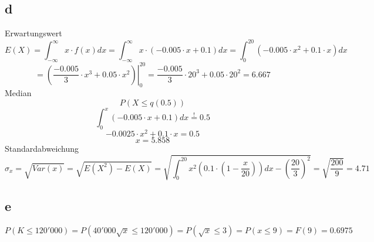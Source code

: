 \subsection{d}
Erwartungswert
\[ E(X) = \int_{-\infty}^{\infty} x \cdot f(x) dx 
= \int_{-\infty}^{\infty} x \cdot (-0.005 \cdot x + 0.1) dx 
= \int_{0}^{20}(-0.005 \cdot x^2 + 0.1 \cdot x) dx \]
\[ = \left.\left(\frac{-0.005}{3} \cdot x^3 
+ 0.05 \cdot x^2\right)\right|_{0}^{20} 
= \frac{-0.005}{3} \cdot 20^3 + 0.05 \cdot 20^2 
= 6.667 \]
Median
\[ P(X \leq q(0.5)) \]
\[ \int_0^{x}(-0.005 \cdot x + 0.1)dx \stackrel{!}{=} 0.5 \]
\[ -0.0025 \cdot x^2 + 0.1 \cdot x = 0.5 \]
\[ x = 5.858 \]
Standardabweichung
\[ \sigma_x = \sqrt{Var(x)} = \sqrt{E(X^2)-E(X)} 
= \sqrt{\int_{0}^{20} x^2 \left(0.1 \cdot 
\left(1 - \frac{x}{20}\right)\right) dx - \left(\frac{20}{3}\right)^2} 
= \sqrt{\frac{200}{9}} = 4.71 \]

\subsection{e}
\[ P(K \leq 120'000) = P(40'000 \sqrt{x} \leq 120'000) = P(\sqrt{x} \leq 3) 
= P(x \leq 9) = F(9) = 0.6975 \]
